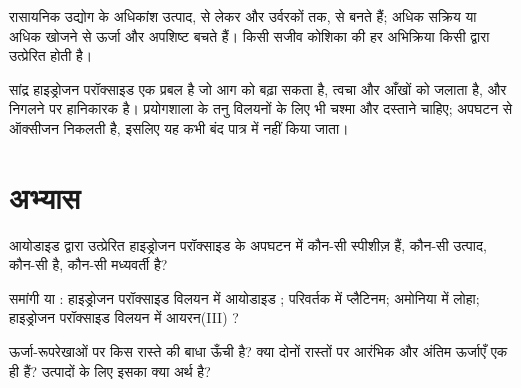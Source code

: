 \begin{remark}[उद्योग और जीवन उत्प्रेरकों पर चलते हैं]\label{rem:g12:catalysis:everywhere}
रासायनिक उद्योग के अधिकांश उत्पाद,  से लेकर  और
उर्वरकों तक,  से बनते हैं; अधिक सक्रिय या अधिक
 खोजने से ऊर्जा और अपशिष्ट बचते हैं। किसी सजीव
कोशिका की हर अभिक्रिया किसी  द्वारा उत्प्रेरित होती है।
\end{remark}

\begin{safety}{}
सांद्र हाइड्रोजन परॉक्साइड एक प्रबल  है जो आग को बढ़ा सकता है,
त्वचा और आँखों को जलाता है, और निगलने पर हानिकारक है। प्रयोगशाला के तनु
विलयनों के लिए भी चश्मा और दस्ताने चाहिए;
अपघटन से ऑक्सीजन निकलती है, इसलिए यह कभी बंद पात्र में नहीं किया जाता।
\end{safety}

\section{अभ्यास}


\begin{exercise}[$\star$]\label{exo:g12:catalysis:1}
आयोडाइड  द्वारा उत्प्रेरित हाइड्रोजन परॉक्साइड के अपघटन में कौन-सी
स्पीशीज़  हैं, कौन-सी उत्पाद, कौन-सी  है, कौन-सी
मध्यवर्ती है?
\end{exercise}

\begin{exercise}[$\star$]\label{exo:g12:catalysis:2}
समांगी या : हाइड्रोजन परॉक्साइड विलयन में आयोडाइड ;
 परिवर्तक में प्लैटिनम; अमोनिया  में लोहा;
हाइड्रोजन परॉक्साइड विलयन में आयरन(III) ?
\end{exercise}

\begin{exercise}[$\star$]\label{exo:g12:catalysis:3}
ऊर्जा-रूपरेखाओं पर किस रास्ते की बाधा ऊँची है? क्या दोनों रास्तों पर
आरंभिक और अंतिम ऊर्जाएँ एक ही हैं? उत्पादों के लिए इसका क्या अर्थ
है?
\end{exercise}

